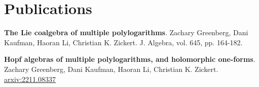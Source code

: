 \section{Publications}

\textbf{The Lie coalgebra of multiple polylogarithms}.
Zachary Greenberg, Dani Kaufman, Haoran Li, Christian K. Zickert. J. Algebra, vol. 645, pp. 164-182.

\textbf{Hopf algebras of multiple polylogarithms, and holomorphic one-forms}.
Zachary Greenberg, Dani Kaufman, Haoran Li, Christian K. Zickert. \href{https://arxiv.org/abs/2211.08337}{arxiv:2211.08337}